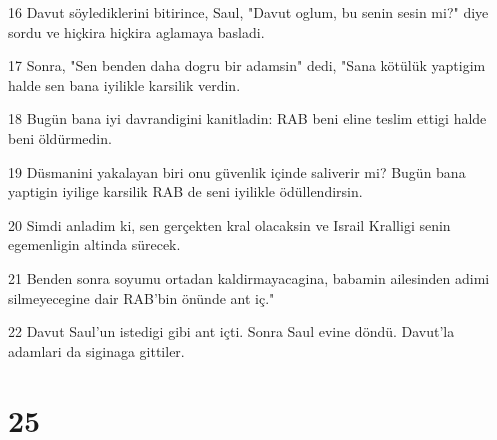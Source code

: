 \par 16 Davut söylediklerini bitirince, Saul, "Davut oglum, bu senin sesin mi?" diye sordu ve hiçkira hiçkira aglamaya basladi.
\par 17 Sonra, "Sen benden daha dogru bir adamsin" dedi, "Sana kötülük yaptigim halde sen bana iyilikle karsilik verdin.
\par 18 Bugün bana iyi davrandigini kanitladin: RAB beni eline teslim ettigi halde beni öldürmedin.
\par 19 Düsmanini yakalayan biri onu güvenlik içinde saliverir mi? Bugün bana yaptigin iyilige karsilik RAB de seni iyilikle ödüllendirsin.
\par 20 Simdi anladim ki, sen gerçekten kral olacaksin ve Israil Kralligi senin egemenligin altinda sürecek.
\par 21 Benden sonra soyumu ortadan kaldirmayacagina, babamin ailesinden adimi silmeyecegine dair RAB'bin önünde ant iç."
\par 22 Davut Saul'un istedigi gibi ant içti. Sonra Saul evine döndü. Davut'la adamlari da siginaga gittiler.

\chapter{25}

